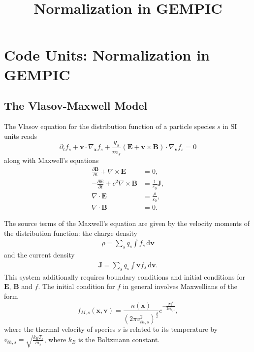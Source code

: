 \documentclass[english]{article}
\title{Normalization in GEMPIC}
\newcommand{\bx}{\textbf{x}}
\newcommand{\bv}{\textbf{v}}
\newcommand{\bB}{\textbf{B}}
\newcommand{\bE}{\textbf{E}}
\newcommand{\bJ}{\textbf{J}}
\newcommand{\du}{\,\mathrm{d}}
\begin{document}
\maketitle

\section{Code Units: Normalization in GEMPIC}

\subsection{The Vlasov-Maxwell Model}

The Vlasov equation for the distribution function of a particle species $s$ in SI units reads
\begin{equation}\label{eq:Vlasov}
	\partial_t f_s + \bv \cdot \nabla_{\bx} f_s + \frac{q_s}{m_s} \left( \bE + \bv \times \bB \right) \cdot \nabla_{\bv} f_s = 0
\end{equation}
along with Maxwell's equations
\begin{align}
	\frac{\partial \bB}{\partial t} + \nabla \times \bE      & = 0,                          \\
	- \frac{\partial \bE}{\partial t} + c^2\nabla \times \bB & = \frac{1}{\varepsilon_0}\bJ, \\
	\nabla \cdot \bE                                         & = \frac{\rho}{\varepsilon_0}, \\
	\nabla \cdot \bB                                         & = 0.
\end{align}

The source terms of the Maxwell's equation are given by the velocity moments of the distribution function: the charge density
\begin{align*}
	\rho= \sum_s q_s \int f_s \du\bv
\end{align*}
and the current density
\begin{align*}
	\bJ =\sum_s q_s\int \bv f_s \du\bv.
\end{align*}
This system additionally requires boundary conditions and initial conditions for $\mathbf{E}$, $\mathbf{B}$ and $f$.
The initial condition for $f$ in general involves Maxwellians of the form
\begin{equation}\label{eq:maxwellian}
	f_{M,s}(\mathbf{x},\mathbf{v})= \frac{n(\mathbf{x})}{(2\pi v_{th,s}^2)^{\frac 32}} e^{-\frac{|\bv|^2}{2v_{th,s}^2}},
\end{equation}
where the thermal velocity of species $s$ is related to its temperature by $v_{th,s}=\sqrt{\frac{k_B T_s}{m_s}}$, where $k_B$ is the Boltzmann constant.
\end{document}
